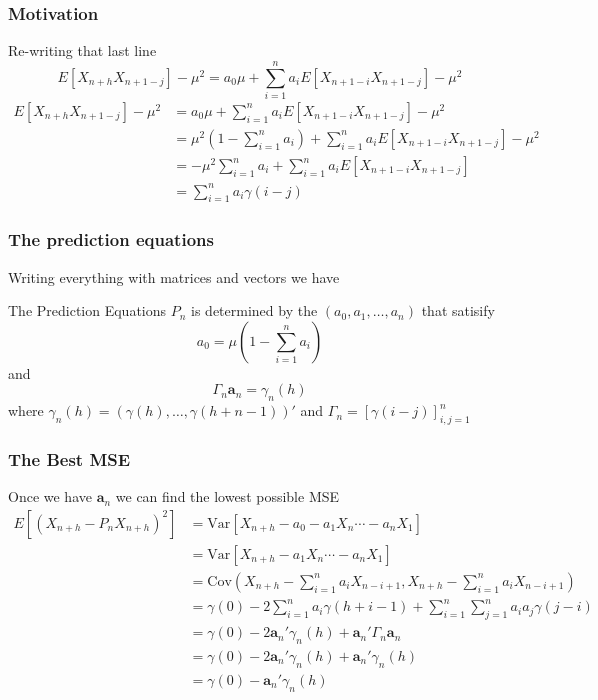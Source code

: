 \documentclass{beamer}
\begin{document}

\begin{frame}
\frametitle{Motivation}

Re-writing that last line
\[
E[X_{n+h}X_{n+1-j}] - \mu^2 = a_0\mu + \sum_{i=1}^na_i E[X_{n+1-i}X_{n+1-j} ] -\mu^2
\]
\begin{align*}
E[X_{n+h}X_{n+1-j}] - \mu^2 &= a_0\mu + \sum_{i=1}^na_i E[X_{n+1-i}X_{n+1-j} ] -\mu^2 \\
&=  \mu^2 \left(1 - \sum_{i=1}^n a_i\right) + \sum_{i=1}^na_i E[X_{n+1-i}X_{n+1-j} ] -\mu^2 \\
&=  - \mu^2 \sum_{i=1}^n a_i + \sum_{i=1}^na_i E[X_{n+1-i}X_{n+1-j} ] \\
&= \sum_{i=1}^n a_i \gamma(i-j)
\end{align*}

\end{frame}

\begin{frame}
\frametitle{The prediction equations}

Writing everything with matrices and vectors we have 
\begin{block}{The Prediction Equations}
$P_n$ is determined by the $(a_0, a_1, \ldots, a_n)$ that satisify
\[
a_0 = \mu\left(1 - \sum_{i=1}^n a_i\right)
\]
and
\[
\Gamma_n \mathbf{a}_n = \gamma_n(h)
\]
where $\gamma_n(h) = (\gamma(h), \ldots, \gamma(h+n-1))'$ and $\Gamma_n = [\gamma(i-j)]_{i,j=1}^n$
\end{block}
\end{frame}

\begin{frame}
\frametitle{The Best MSE}

Once we have $\mathbf{a}_n$ we can find the lowest possible MSE
\begin{align*}
E[(X_{n+h}-P_nX_{n+h})^2] &= \text{Var}[X_{n+h} - a_0 - a_1X_n\cdots - a_nX_1 ]\\
&= \text{Var}[X_{n+h} - a_1X_n\cdots - a_nX_1 ] \\
&= \text{Cov}(X_{n+h} - \sum_{i=1}^n a_i X_{n-i+1}, X_{n+h} - \sum_{i=1}^n a_i X_{n-i+1})\\
&= \gamma(0) - 2 \sum_{i=1}^na_i \gamma(h+i-1) + \sum_{i=1}^n \sum_{j=1}^n a_i a_j \gamma(j-i) \\
&= \gamma(0) - 2 \mathbf{a}_n'\gamma_n(h) + \mathbf{a}_n' \Gamma_n \mathbf{a}_n \\
&= \gamma(0) - 2 \mathbf{a}_n'\gamma_n(h) + \mathbf{a}_n'\gamma_n(h) \\
&= \gamma(0) -  \mathbf{a}_n'\gamma_n(h)
\end{align*}

\end{frame}
\end{document}
